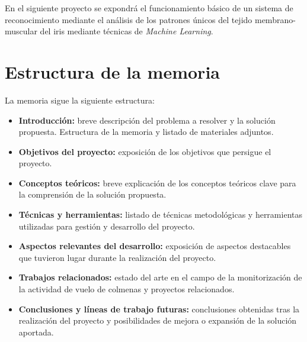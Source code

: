 En el siguiente proyecto se expondrá el funcionamiento básico de un sistema de reconocimiento mediante el análisis de los patrones únicos del tejido membrano-muscular del iris mediante técnicas de \emph{Machine Learning}.

\section{Estructura de la memoria}\label{estructura-de-la-memoria}


La memoria sigue la siguiente estructura:
\begin{itemize}
\tightlist
\item
  \textbf{Introducción:} breve descripción del problema a resolver y la
  solución propuesta. Estructura de la memoria y listado de materiales
  adjuntos.
\item
  \textbf{Objetivos del proyecto:} exposición de los objetivos que
  persigue el proyecto.
\item
  \textbf{Conceptos teóricos:} breve explicación de los conceptos
  teóricos clave para la comprensión de la solución propuesta.
\item
  \textbf{Técnicas y herramientas:} listado de técnicas metodológicas y
  herramientas utilizadas para gestión y desarrollo del proyecto.
\item
  \textbf{Aspectos relevantes del desarrollo:} exposición de aspectos
  destacables que tuvieron lugar durante la realización del proyecto.
\item
  \textbf{Trabajos relacionados:} estado del arte en el campo de la
  monitorización de la actividad de vuelo de colmenas y proyectos
  relacionados.
\item
  \textbf{Conclusiones y líneas de trabajo futuras:} conclusiones
  obtenidas tras la realización del proyecto y posibilidades de mejora o
  expansión de la solución aportada.
\end{itemize}

